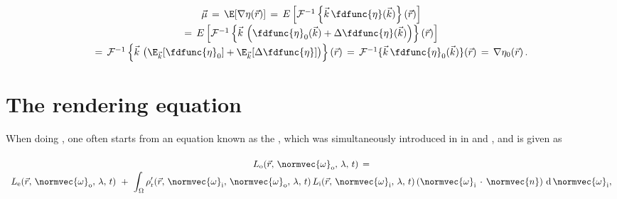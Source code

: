 {\begin{equation}
\renewcommand*{\arraystretch}{1.5}
\begin{array}{c}
\vec{\mu} \,=\, \E[\nabla\eta(\vec{r})] \,=\, E\left[\mathcal{F}^{-1}\left\{\vec{k}\,\fdfunc{\eta}(\vec{k})\right\}(\vec{r})\right] \\
=\, E\left[\mathcal{F}^{-1}\left\{\vec{k}\,\left(\fdfunc{\eta}_0(\vec{k})+\Delta\fdfunc{\eta}(\vec{k})\right)\right\}(\vec{r})\right] \\
=\, \mathcal{F}^{-1}\left\{\vec{k}\,\left(\E_{\vec{k}}[\fdfunc{\eta}_0]+\E_{\vec{k}}[\Delta\fdfunc{\eta}]\right)\right\}(\vec{r}) \,=\, \mathcal{F}^{-1}\{\vec{k}\,\fdfunc{\eta}_0(\vec{k})\}(\vec{r}) \,=\, \nabla\eta_0(\vec{r})\,.
\end{array}
\end{equation}

\HRule





















\section{The rendering equation}

When doing , one often starts from an equation known as the , which was simultaneously introduced in  in \citep{temp} and \citep{temp}, and is given as

\begin{equation} \label{eq:rendering_equation_original}
\begin{array}{c}
L_{\text{o}}(\vec{r},\,\normvec{\omega}_{\text{o}},\, \lambda,\, t) \,= \\
\displaystyle L_{\text{e}}(\vec{r},\, \normvec{\omega}_{\text{o}},\, \lambda,\, t) \ + \ \int_\Omega \rho'_{\text{r}}(\vec{r},\, \normvec{\omega}_{\text{i}},\, \normvec{\omega}_{\text{o}},\, \lambda,\, t)\, L_{\text{i}}(\vec{r},\, \normvec{\omega}_{\text{i}},\, \lambda,\, t)\, (\normvec{\omega}_{\text{i}}\,\cdot\,\normvec{n})\, \operatorname d \normvec{\omega}_{\text{i}},
\end{array}
\end{equation}

}

